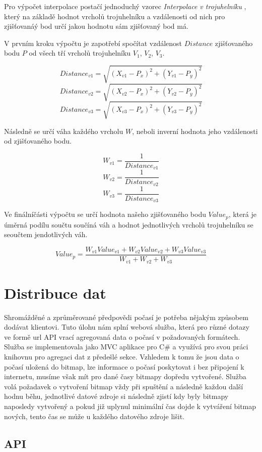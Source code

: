 \documentclass[czech,bachelor,dept460,male,csharp,cpdeclaration]{diploma}
\begin{document}
	Pro výpočet interpolace postačí jednoduchý vzorec \emph{Interpolace v trojuhelníku} \cite{interp}, který na základě hodnot vrcholů trojuhelníku a vzdálenosti od nich pro zjišťovanáý bod určí jakou hodnotu sám zjišťovaný bod má.
	
	
	V prvním kroku výpočtu je zapotřebí spočítat vzdálenost $Distance$ zjišťovaného bodu $P$ od všech tří vrcholů trojuhelníku $V_1$, $V_2$, $V_3$. 
	
	\[Distance_{v1} =\sqrt{(X_{v1}-P_x)^2+(Y_{v1}-P_y)^2}\]
	\[Distance_{v2} =\sqrt{(X_{v2}-P_x)^2+(Y_{v2}-P_y)^2}\]
	\[Distance_{v3} =\sqrt{(X_{v3}-P_x)^2+(Y_{v3}-P_y)^2}\]
	
	Následně se určí váha každého vrcholu $W$, neboli inverní hodnota jeho vzdálenosti od zjišťovaného bodu.
	
	\[W_{v1} =\frac{1}{Distance_{v1}}\]
	\[W_{v2} =\frac{1}{Distance_{v2}}\]
	\[W_{v3} =\frac{1}{Distance_{v3}}\]
	
	Ve finálníčásti výpočtu se určí hodnota našeho zjišťovaného bodu $Value_p$, která je úměrná podílu součtu součíná váh a hodnot jednotlivých vrcholů trojuhelníku se seoučtem jendotlivých váh.
	
	\[Value_p = \frac{W_{v1}Value_{v1} + W_{v2}Value_{v2} + W_{v3}Value_{v3}}{W_{v1} + W_{v2} + W_{v3}} \]
	
	
	\chapter{Distribuce dat}
	
	Shromážděné a zprůměrované předpovědi počasí je potřeba nějakým způsobem dodávat klientovi. Tuto úlohu nám splní webová služba, která pro různé dotazy ve formě url API vrací agregovaná data o počasí v požadovaných formátech. Služba se implementovala jako MVC aplikace pro C\# a využívá pro svou práci knihovnu pro agregaci dat z předešlé sekce. Vzhledem k tomu že jsou data o počasí uložená do bitmap, lze informace o počasí poskytovat i bez připojení k internetu, musíme však mít pro dané časy bitmapy dopředu vytvořené. Služba volá požadavek o vytvoření bitmap vždy při spuštění a následně každou další hodnu běhu, jednotlivé datové zdroje si následně zjistí kdy byly bitmapy naposledy vytvořený a pokud již uplynul minimální čas dojde k vytváření bitmap nových, tento čas se může u každého datového zdroje lišit.
	
	\section{API}
	
\end{document}
